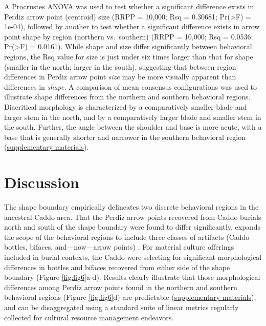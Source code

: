 \documentclass[smallextended]{svjour3}       %
\begin{document}
A Procrustes ANOVA was used to test whether a significant difference
exists in Perdiz arrow point (centroid) size (RRPP = 10,000; Rsq =
0.30681; Pr(\textgreater F) = 1e-04), followed by another to test
whether a significant difference exists in arrow point shape by region
(northern vs.~southern) (RRPP = 10,000; Rsq = 0.0536; Pr(\textgreater F)
= 0.0161). While shape and size differ significantly between behavioral
regions, the Rsq value for size is just under six times larger than that
for shape (smaller in the north; larger in the south), suggesting that
between-region differences in Perdiz arrow point \emph{size} may be more
visually apparent than differences in \emph{shape}. A comparison of mean
consensus configurations was used to illustrate shape differences from
the northern and southern behavioral regions. Diacritical morphology is
characterized by a comparatively smaller blade and larger stem in the
north, and by a comparatively larger blade and smaller stem in the
south. Further, the angle between the shoulder and base is more acute,
with a base that is generally shorter and narrower in the southern
behavioral region
(\href{https://seldenlab.github.io/perdiz3/}{supplementary materials}).

\hypertarget{discussion}{%
\section{Discussion}\label{discussion}}

The shape boundary empirically delineates two discrete behavioral
regions in the ancestral Caddo area. That the Perdiz arrow points
recovered from Caddo burials north and south of the shape boundary were
found to differ significantly, expands the scope of the behavioral
regions to include three classes of artifacts (Caddo bottles, bifaces,
and---now---arrow points)
\cite{RN8074,RN7927,RN8370,RN8312,RN8322,RN8158,RN11097}. For material
culture offerings included in burial contexts, the Caddo were selecting
for significant morphological differences in bottles and bifaces
recovered from either side of the shape boundary (Figure
\ref{fig:fig6}a-d). Results clearly illustrate that those morphological
differences among Perdiz arrow points found in the northern and southern
behavioral regions (Figure \ref{fig:fig6}d) are predictable
(\href{https://seldenlab.github.io/perdiz3/}{supplementary materials}),
and can be disaggregated using a standard suite of linear metrics
regularly collected for cultural resource management endeavors.
\end{document}
